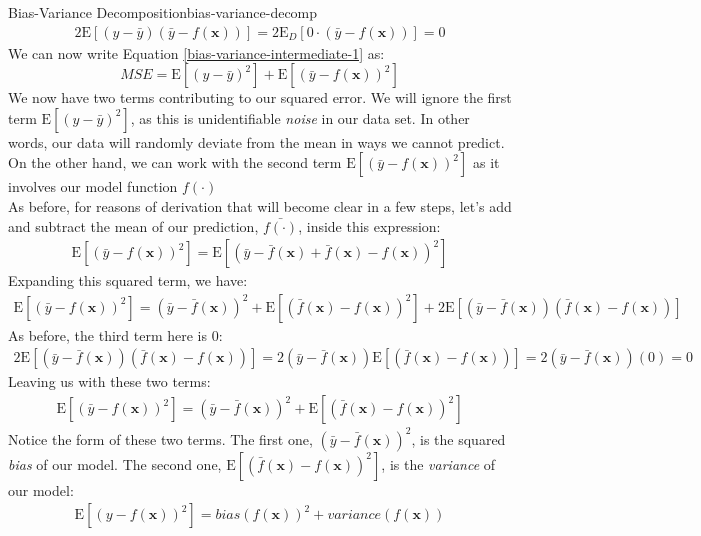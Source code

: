\begin{derivation}{Bias-Variance Decomposition}{bias-variance-decomp}
\begin{align*}
        2\mathrm{E}[(y - \bar{y})(\bar{y} - f(\textbf{x}))] = 2\mathrm{E}_{D}[0 \cdot (\bar{y} - f(\textbf{x}))] = 0
    \end{align*}
    We can now write Equation \ref{bias-variance-intermediate-1} as:
    \begin{equation} \label{bias-variance-intermediate-2}
        \textit{MSE} = \mathrm{E}[(y - \bar{y})^{2}] + \mathrm{E}[(\bar{y} - f(\textbf{x}))^{2}]
    \end{equation}
    We now have two terms contributing to our squared error. We will ignore the first term $\mathrm{E}[(y - \bar{y})^{2}]$, as this is unidentifiable \textit{noise} in our data set. In other words, our data will randomly deviate from the mean in ways we cannot predict. On the other hand, we can work with the second term $\mathrm{E}[(\bar{y} - f(\textbf{x}))^{2}]$ as it involves our model function $f(\cdot)$ \\

    As before, for reasons of derivation that will become clear in a few steps, let's add and subtract the mean of our prediction, $\bar{f(\cdot)}$, inside this expression:
    \begin{align*}
        \mathrm{E}[(\bar{y} - f(\textbf{x}))^{2}] = \mathrm{E}[(\bar{y} - \bar{f}(\textbf{x}) + \bar{f}(\textbf{x}) - f(\textbf{x}))^{2}]
    \end{align*}
    Expanding this squared term, we have:
    \begin{align*}
        \mathrm{E}[(\bar{y} - f(\textbf{x}))^{2}] = (\bar{y} - \bar{f}(\textbf{x}))^{2} + \mathrm{E}[(\bar{f}(\textbf{x}) - f(\textbf{x}))^{2}] + 2\mathrm{E}[(\bar{y} - \bar{f}(\textbf{x}))(\bar{f}(\textbf{x}) - f(\textbf{x}))]
    \end{align*}
    As before, the third term here is 0:
    \begin{align*}
        2\mathrm{E}[(\bar{y} - \bar{f}(\textbf{x}))(\bar{f}(\textbf{x}) - f(\textbf{x}))] = 2(\bar{y} - \bar{f}(\textbf{x}))\mathrm{E}[(\bar{f}(\textbf{x}) - f(\textbf{x}))] = 2(\bar{y} - \bar{f}(\textbf{x}))(0) = 0
    \end{align*}
    Leaving us with these two terms:
    \begin{align*}
        \mathrm{E}[(\bar{y} - f(\textbf{x}))^{2}] = (\bar{y} - \bar{f}(\textbf{x}))^{2} + \mathrm{E}[(\bar{f}(\textbf{x}) - f(\textbf{x}))^{2}]
    \end{align*}
    Notice the form of these two terms. The first one, $(\bar{y} - \bar{f}(\textbf{x}))^{2}$, is the squared \textit{bias} of our model. The second one, $\mathrm{E}[(\bar{f}(\textbf{x}) - f(\textbf{x}))^{2}]$, is the \textit{variance} of our model:
    \begin{align*}
        \mathrm{E}[(y - f(\textbf{x}))^{2}] = \textit{bias}(f(\textbf{x}))^{2} + \textit{variance}(f(\textbf{x}))
    \end{align*}


\end{derivation}
